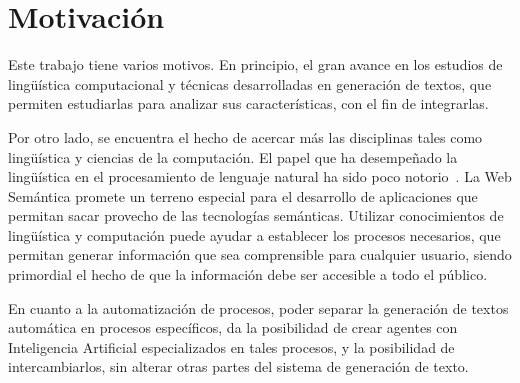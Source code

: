 \documentclass[11pt,a4paper,spanish]{book}
\begin{document}
\section{Motivación}
Este trabajo tiene varios motivos.
En principio, el gran avance en los estudios de lingüística computacional y técnicas desarrolladas en generación de textos, que permiten estudiarlas para analizar sus características, con el fin de integrarlas.

Por otro lado, se encuentra el hecho de acercar más las disciplinas tales como lingüística y ciencias de la computación. El papel que ha desempeñado la lingüística en el procesamiento de lenguaje natural ha sido poco notorio~\cite{perinan2012defensa}. La Web Semántica promete un terreno especial para el desarrollo de aplicaciones que permitan sacar provecho de las tecnologías semánticas. Utilizar conocimientos de lingüística y computación puede ayudar a establecer los procesos necesarios, que permitan generar información que sea comprensible para cualquier usuario, siendo primordial el hecho de que la información debe ser accesible a todo el público.

En cuanto a la automatización de procesos, poder separar la generación de textos automática en procesos específicos, da la posibilidad de crear agentes con Inteligencia Artificial especializados en tales procesos, y la posibilidad de intercambiarlos, sin alterar otras partes del sistema de generación de texto.















\end{document}
